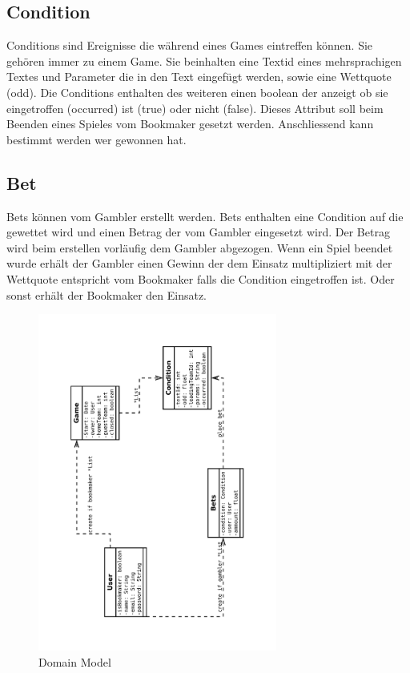 \documentclass[a4paper, abstracton]{scrartcl}
\begin{document}
  \subsection{Condition}
    Conditions sind Ereignisse die während eines Games eintreffen können.
    Sie gehören immer zu einem Game.
    Sie beinhalten eine Textid eines mehrsprachigen Textes und Parameter
    die in den Text eingefügt werden, sowie eine Wettquote (odd).  
    Die Conditions enthalten des weiteren einen boolean der anzeigt ob
    sie eingetroffen (occurred) ist (true) oder nicht (false).
    Dieses Attribut soll beim Beenden eines Spieles vom Bookmaker gesetzt
    werden. Anschliessend kann bestimmt werden wer gewonnen hat.
     
  \subsection{Bet}
    Bets können vom Gambler erstellt werden.
    Bets enthalten eine Condition auf die gewettet wird und einen Betrag
    der vom Gambler eingesetzt wird. Der Betrag wird beim erstellen vorläufig
    dem Gambler abgezogen. Wenn ein Spiel beendet wurde erhält der Gambler
    einen Gewinn der dem Einsatz multipliziert mit der Wettquote entspricht
    vom Bookmaker falls die Condition eingetroffen ist. Oder sonst erhält der Bookmaker den Einsatz. 

  \begin{figure}[h!]
  \begin{center}
    \includegraphics[width=0.7\textwidth,angle=-90]{images/DomainModel.pdf}
  \end{center}
  \caption{Domain Model}
  \label{fig:domain_model}
\end{figure}
\end{document}
